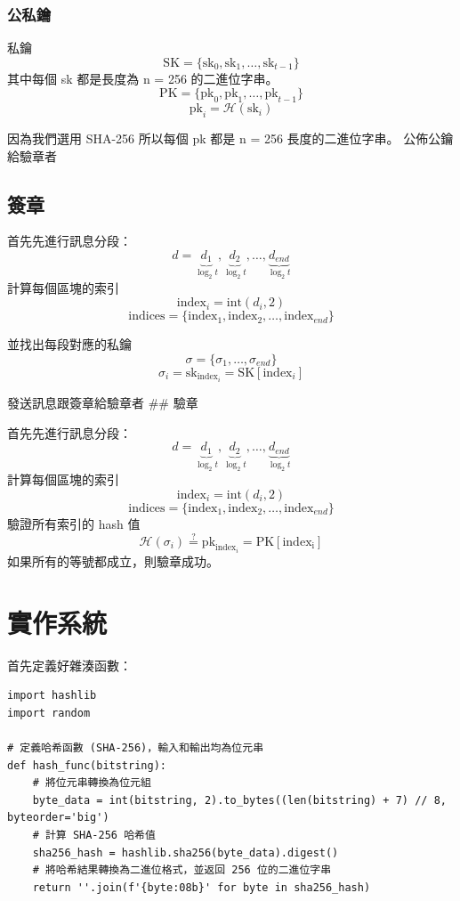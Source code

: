 \documentclass[
]{article}
\begin{document}
\hypertarget{ux516cux79c1ux9470}{%
\subsubsection{公私鑰}\label{ux516cux79c1ux9470}}

私鑰 \[
\mathrm{SK}=\{\mathrm{sk}_{0},\mathrm{sk}_{1},\dots,\mathrm{sk}_{t-1}\}
\] 其中每個 sk 都是長度為 n = 256 的二進位字串。 \[
\mathrm{PK}=\{\mathrm{pk}_{0},\mathrm{pk}_{1},\dots,\mathrm{pk}_{t-1}\}
\] \[
\mathrm{pk}_{i}= \mathcal{H}(\mathrm{sk}_{i})
\]

因為我們選用 SHA-256 所以每個 pk 都是 n = 256 長度的二進位字串。
公佈公鑰給驗章者

\hypertarget{ux7c3dux7ae0}{%
\subsection{簽章}\label{ux7c3dux7ae0}}

首先先進行訊息分段： \[
d = \underbrace{ d_{1} }_{ \log_{2}t },\underbrace{ d_{2} }_{ \log_{2}t},\dots,\underbrace{ d_{end} }_{ \log_{2}t}
\] 計算每個區塊的索引 \[
\mathrm{index}_{i} = \mathrm{int}(d_{i},2)
\] \[
\mathrm{indices} = \{ \mathrm{index}_{1},\mathrm{index}_{2},\dots, \mathrm{index}_{end}\}
\]

並找出每段對應的私鑰 \[
\sigma 
= \{\sigma_{1},\dots,\sigma_{end}\}
\] \[
\sigma_{i} = \mathrm{sk}_{\mathrm{index}_{i}} = \mathrm{SK}[\mathrm{index}_{i}]
\]

發送訊息跟簽章給驗章者 \#\# 驗章

首先先進行訊息分段： \[
d = \underbrace{ d_{1} }_{ \log_{2}t },\underbrace{ d_{2} }_{ \log_{2}t},\dots,\underbrace{ d_{end} }_{ \log_{2}t}
\] 計算每個區塊的索引 \[
\mathrm{index}_{i} = \mathrm{int}(d_{i},2)
\] \[
\mathrm{indices} = \{ \mathrm{index}_{1},\mathrm{index}_{2},\dots, \mathrm{index}_{end}\}
\] 驗證所有索引的 hash 值 \[
\mathcal{H}(\sigma_{i}) 
\overset{?}{=} \mathrm{pk}_{\mathrm{index}_{i}} = \mathrm{PK}[\mathrm{index_{i}}]
\] 如果所有的等號都成立，則驗章成功。

\hypertarget{ux5be6ux4f5cux7cfbux7d71}{%
\section{實作系統}\label{ux5be6ux4f5cux7cfbux7d71}}

首先定義好雜湊函數：

\begin{verbatim}
import hashlib
import random

# 定義哈希函數 (SHA-256)，輸入和輸出均為位元串
def hash_func(bitstring):
    # 將位元串轉換為位元組
    byte_data = int(bitstring, 2).to_bytes((len(bitstring) + 7) // 8, byteorder='big')
    # 計算 SHA-256 哈希值
    sha256_hash = hashlib.sha256(byte_data).digest()
    # 將哈希結果轉換為二進位格式，並返回 256 位的二進位字串
    return ''.join(f'{byte:08b}' for byte in sha256_hash)
\end{verbatim}
\end{document}

